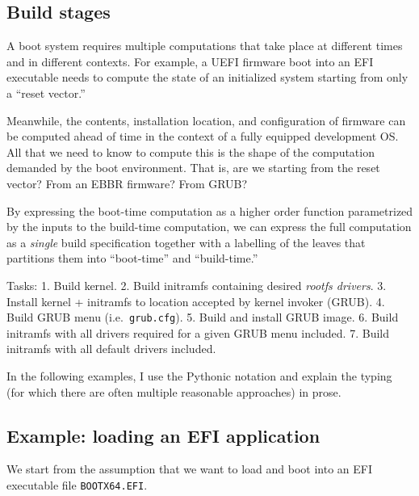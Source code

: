 \subsection{Build stages}

A boot system requires multiple computations that take place at
different times and in different contexts. For example, a UEFI firmware
boot into an EFI executable needs to compute the state of an initialized
system starting from only a ``reset vector.''

Meanwhile, the contents, installation location, and configuration of
firmware can be computed ahead of time in the context of a fully
equipped development OS. All that we need to know to compute this is the
shape of the computation demanded by the boot environment. That is, are
we starting from the reset vector? From an EBBR firmware? From GRUB?

By expressing the boot-time computation as a higher order function
parametrized by the inputs to the build-time computation, we can express
the full computation as a \emph{single} build specification together
with a labelling of the leaves that partitions them into ``boot-time''
and ``build-time.''

Tasks: 1. Build kernel. 2. Build initramfs containing desired
\emph{rootfs drivers}. 3. Install kernel + initramfs to location
accepted by kernel invoker (GRUB). 4. Build GRUB menu
(i.e.~\texttt{grub.cfg}). 5. Build and install GRUB image. 6. Build
initramfs with all drivers required for a given GRUB menu included. 7.
Build initramfs with all default drivers included.

In the following examples, I use the Pythonic notation and explain the
typing (for which there are often multiple reasonable approaches) in
prose.


\subsection{Example: loading an EFI application}

We start from the assumption that we want to load and boot into an EFI
executable file \texttt{BOOTX64.EFI}.

